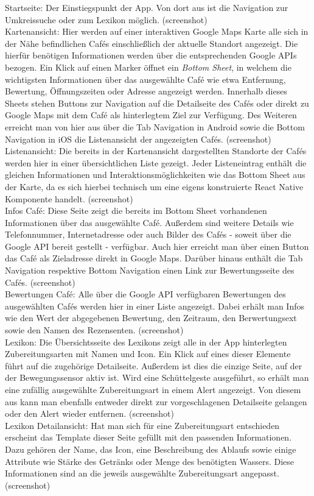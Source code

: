 Startseite:
Der Einstiegspunkt der App.
Von dort aus ist die Navigation zur Umkreissuche oder zum Lexikon möglich.
(screenshot)
\\
Kartenansicht:
Hier werden auf einer interaktiven Google Maps Karte alle sich in der Nähe befindlichen Cafés einschließlich der aktuelle Standort angezeigt.
Die hierfür benötigen Informationen werden über die entsprechenden Google APIs bezogen.
Ein Klick auf einen Marker öffnet ein \emph{Bottom Sheet}, in welchem die wichtigsten Informationen über das ausgewählte Café wie etwa Entfernung, Bewertung, Öffnungszeiten oder Adresse angezeigt werden.
Innerhalb dieses Sheets stehen Buttons zur Navigation auf die Detailseite des Cafés oder direkt zu Google Maps mit dem Café als hinterlegtem Ziel zur Verfügung.
Des Weiteren erreicht man von hier aus über die Tab Navigation in Android sowie die Bottom Navigation in iOS die Listenansicht der angezeigten Cafés.
(screenshot)
\\
Listenansicht:
Die bereits in der Kartenansicht dargestellten Standorte der Cafés werden hier in einer übersichtlichen Liste gezeigt.
Jeder Listeneintrag enthält die gleichen Informationen und Interaktionsmöglichkeiten wie das Bottom Sheet aus der Karte, da es sich hierbei technisch um eine eigens konstruierte React Native Komponente handelt.
(screenshot)
\\
Infos Café:
Diese Seite zeigt die bereits im Bottom Sheet vorhandenen Informationen über das ausgewählte Café.
Außerdem sind weitere Details wie Telefonnummer, Internetadresse oder auch Bilder des Cafés - soweit über die Google API bereit gestellt - verfügbar.
Auch hier erreicht man über einen Button das Café als Zieladresse direkt in Google Maps.
Darüber hinaus enthält die Tab Navigation respektive Bottom Navigation einen Link zur Bewertungsseite des Cafés.
(screenshot)
\\
Bewertungen Café:
Alle über die Google API verfügbaren Bewertungen des ausgewählten Cafés werden hier in einer Liste angezeigt.
Dabei erhält man Infos wie den Wert der abgegebenen Bewertung, den Zeitraum, den Berwertungsext sowie den Namen des Re­zen­senten.
(screenshot)
\\
Lexikon:
Die Übersichtsseite des Lexikons zeigt alle in der App hinterlegten Zubereitungsarten mit Namen und Icon.
Ein Klick auf eines dieser Elemente führt auf die zugehörige Detailseite.
Außerdem ist dies die einzige Seite, auf der der Bewegungssensor aktiv ist.
Wird eine Schüttelgeste ausgeführt, so erhält man eine zufällig ausgewählte Zubereitungsart in einem Alert angezeigt.
Von diesem aus kann man ebenfalls entweder direkt zur vorgeschlagenen Detailseite gelangen oder den Alert wieder entfernen.
(screenshot)
\\
Lexikon Detailansicht:
Hat man sich für eine Zubereitungsart entschieden erscheint das Template dieser Seite gefüllt mit den passenden Informationen.
Dazu gehören der Name, das Icon, eine Beschreibung des Ablaufs sowie einige Attribute wie Stärke des Getränks oder Menge des benötigten Wassers.
Diese Informationen sind an die jeweils ausgewählte Zubereitungsart angepasst.
(screenshot)



